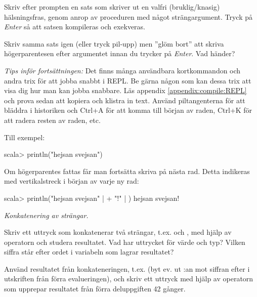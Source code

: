 \Subtask Skriv efter prompten  en sats som skriver ut en valfri (bruklig/knasig) hälsningsfras, genom anrop av proceduren  med något strängargument. Tryck på \textit{Enter} så att satsen kompileras och exekveras. 

\Subtask Skriv samma sats igen (eller tryck pil-upp) men ''glöm bort'' att skriva högerparentesen efter argumentet innan du trycker på \textit{Enter}. Vad händer?

\begin{framed}
\noindent\emph{Tips inför fortsättningen:} Det finns många användbara kortkommandon och andra trix för att jobba snabbt i REPL. Be gärna någon som kan dessa trix att visa dig hur man kan jobba snabbare. Läs appendix \ref{appendix:compile:REPL} och prova sedan att kopiera och klistra in text. Använd piltangenterna för att bläddra i historiken och Ctrl+A för att komma till början av raden, Ctrl+K för att radera resten av raden, etc.
\end{framed}



\SOLUTION 
\TaskSolved \what

\SubtaskSolved Till exempel:
\begin{REPLnonum}
scala> println("hejsan svejsan")
\end{REPLnonum}

\SubtaskSolved Om högerparentes fattas får man fortsätta skriva på nästa rad. Detta indikeras med vertikalstreck i början av varje ny rad:
\begin{REPLnonum}
scala> println("hejsan svejsan"
     | + "!" 
     | )
hejsan svejsan!
\end{REPLnonum}

\QUESTEND



\def\what{\emph{Konkatenering av strängar.}}

\QUESTBEGIN

\Task \what

\Subtask Skriv ett uttryck som konkatenerar två strängar, t.ex.  och , med hjälp av operatorn \code{+} och studera resultatet. Vad har uttrycket för värde och typ? Vilken siffra står efter ordet  i variabeln som lagrar resultatet?

\Subtask Använd resultatet från konkateneringen, t.ex.  (byt ev. ut :an mot siffran efter  i utskriften från förra evalueringen), och skriv ett uttryck med hjälp av operatorn \code{*} som upprepar resultatet från förra deluppgiften 42 gånger. 


